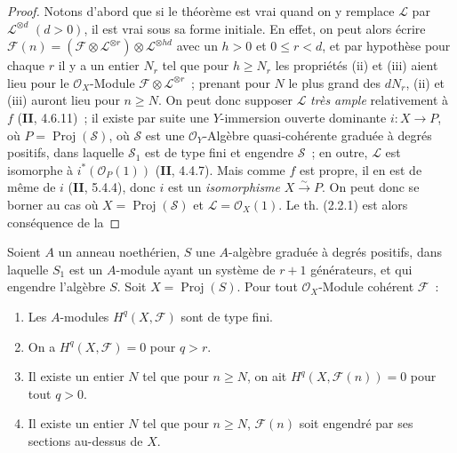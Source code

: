 \begin{proof}
Notons d'abord que si le théorème est vrai quand on y remplace
$\mathcal L$ par $\mathcal L^{\otimes d}$ $(d>0)$, il est vrai sous sa
forme initiale. En effet, on peut alors écrire
$\mathcal F(n)
=(\mathcal F\otimes\mathcal L^{\otimes r})
\otimes\mathcal L^{\otimes hd}$
avec un $h>0$ et $0\leq r<d$, et par hypothèse pour chaque $r$ il y a
un entier $N_r$ tel que pour $h\geq N_r$ les propriétés (ii) et (iii)
aient lieu pour le $\mathcal O_X$-Module
$\mathcal F\otimes\mathcal L^{\otimes r}$~; prenant pour $N$ le plus grand
des $dN_r$, (ii) et (iii) auront lieu pour $n\geq N$. On peut donc
supposer $\mathcal L$ \emph{très ample} relativement à $f$ (\textbf{II}, 4.6.11)~; il
existe par suite une $Y$-immersion ouverte dominante
$i:X\to P$, où $P=\operatorname{Proj}(\mathcal S)$, où $\mathcal S$ est
une $\mathcal O_Y$-Algèbre quasi-cohérente graduée à degrés positifs, dans
laquelle $\mathcal S_1$ est de type fini et engendre $\mathcal S$~; en
outre, $\mathcal L$ est isomorphe à $i^*(\mathcal O_P(1))$ (\textbf{II}, 4.4.7).
Mais comme $f$ est propre, il en est de même de $i$ (\textbf{II}, 5.4.4), donc
$i$ est un \emph{isomorphisme} $X\xrightarrow{\sim}P$. On peut donc se borner au
cas où $X=\operatorname{Proj}(\mathcal S)$ et
$\mathcal L=\mathcal O_X(1)$. Le th. (2.2.1) est alors conséquence de la
\end{proof}

\begin{proposition}[2.2.2]
\label{III.2.2.2-fr}
Soient $A$ un anneau noethérien, $S$ une $A$-algèbre graduée à degrés
positifs, dans laquelle $S_1$ est un $A$-module ayant un système de $r+1$
générateurs, et qui engendre l'algèbre $S$. Soit
$X=\operatorname{Proj}(S)$. Pour tout $\mathcal O_X$-Module cohérent
$\mathcal F$~:
\begin{enumerate}
\item[{\rm(i)}] Les $A$-modules $H^q(X,\mathcal F)$ sont de type fini.
\item[{\rm(ii)}] On a $H^q(X,\mathcal F)=0$ pour $q>r$.
\item[{\rm(iii)}] Il existe un entier $N$ tel que pour $n\geq N$, on ait
$H^q(X,\mathcal F(n))=0$ pour tout $q>0$.
\item[{\rm(iv)}] Il existe un entier $N$ tel que pour $n\geq N$,
$\mathcal F(n)$ soit engendré par ses sections au-dessus de $X$.
\end{enumerate}
\end{proposition}

